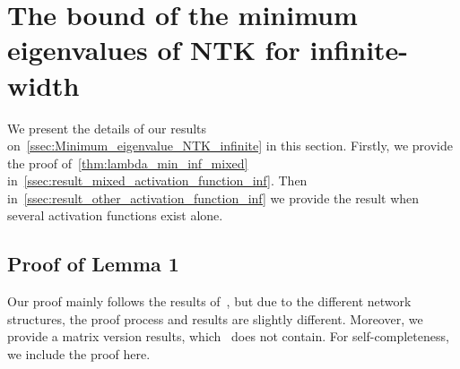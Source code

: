 \documentclass[nohyperref]{article}
\theoremstyle{plain}
\theoremstyle{definition}
\theoremstyle{remark}
\begin{document}
\section{The bound of the minimum eigenvalues of NTK for infinite-width}
\label{sec:infinitely_width}

We present the details of our results on~\cref{ssec:Minimum_eigenvalue_NTK_infinite} in this section. Firstly, we provide the proof of~\cref{thm:lambda_min_inf_mixed} in~\cref{ssec:result_mixed_activation_function_inf}. Then in~\cref{ssec:result_other_activation_function_inf} we provide the result when several activation functions exist alone.

\subsection{Proof of Lemma 1}

Our proof mainly follows the results of~\citet{huang2020deep}, but due to the different network structures, the proof process and results are slightly different. Moreover, we provide a matrix version results, which~\citet{huang2020deep} does not contain. For self-completeness, we include the proof here.
\end{document}
